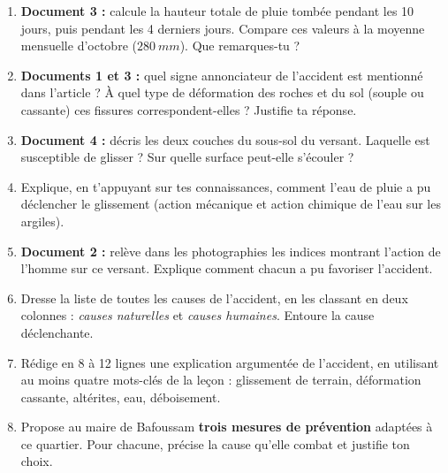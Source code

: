 \documentclass[11pt]{article}
\newcommand{\cle}[1]{{\popxbold\color{popdark}#1}}
\newcounter{popsec}
\newcounter{popsub}
\newcommand{\courssub}[1]{%
  \stepcounter{popsub}%
  \par\vspace{9pt}\noindent{\popxbold\fontsize{11.5}{13}\selectfont\color{popink}{\color{poporange}\thepopsec.\thepopsub}\hspace{6pt}#1}\par\nopagebreak\vspace{4pt}
}
\begin{document}
\begin{enumerate}
\item \textbf{Document 3 :} calcule la hauteur totale de pluie tombée pendant les 10 jours, puis pendant les 4 derniers jours. Compare ces valeurs à la moyenne mensuelle d'octobre ($\SI{280}{mm}$). Que remarques-tu ?
\item \textbf{Documents 1 et 3 :} quel signe annonciateur de l'accident est mentionné dans l'article ? À quel type de déformation des roches et du sol (souple ou cassante) ces fissures correspondent-elles ? Justifie ta réponse.
\item \textbf{Document 4 :} décris les deux couches du sous-sol du versant. Laquelle est susceptible de glisser ? Sur quelle surface peut-elle s'écouler ?
\item Explique, en t'appuyant sur tes connaissances, comment l'eau de pluie a pu déclencher le glissement (action mécanique et action chimique de l'eau sur les argiles).
\item \textbf{Document 2 :} relève dans les photographies les indices montrant l'action de l'homme sur ce versant. Explique comment chacun a pu favoriser l'accident.
\item Dresse la liste de toutes les causes de l'accident, en les classant en deux colonnes : \emph{causes naturelles} et \emph{causes humaines}. Entoure la cause déclenchante.
\item Rédige en 8 à 12 lignes une explication argumentée de l'accident, en utilisant au moins quatre mots-clés de la leçon : \cle{glissement de terrain}, \cle{déformation cassante}, \cle{altérites}, \cle{eau}, \cle{déboisement}.
\item Propose au maire de Bafoussam \textbf{trois mesures de prévention} adaptées à ce quartier. Pour chacune, précise la cause qu'elle combat et justifie ton choix.
\end{enumerate}

\courssub{Ressources à mobiliser}
\end{document}
